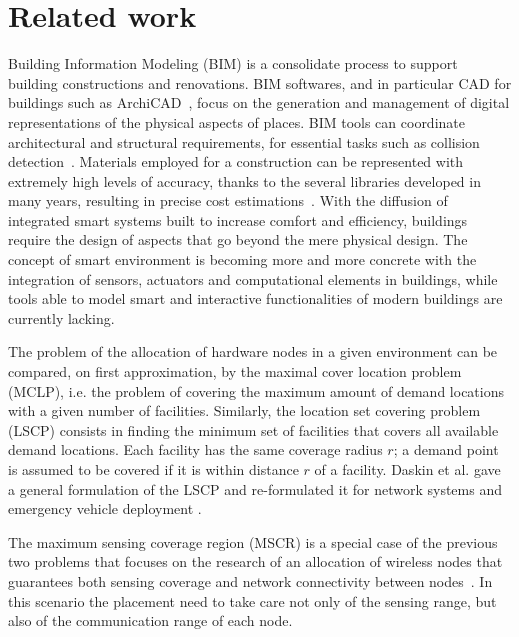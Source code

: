 \section{Related work}\label{sec:related}
Building Information Modeling (BIM) is a consolidate process to support building constructions and renovations. BIM softwares, and in particular CAD for buildings such as ArchiCAD~\cite{Archicad}, focus on the generation and management of digital representations of the physical aspects of places. BIM tools can coordinate architectural and structural requirements, for essential tasks such as collision detection~\cite{Zhang2011}. Materials employed for a construction can be represented with extremely high levels of accuracy, thanks to the several libraries developed in many years, resulting in precise cost estimations~\cite{Xu2014}. With the diffusion of integrated smart systems built to increase comfort and efficiency, buildings require the design of aspects that go beyond the mere physical design. The concept of smart environment is becoming more and more concrete with the integration of sensors, actuators and computational elements in buildings, while tools able to model smart and interactive functionalities of modern buildings are currently lacking.

The problem of the allocation of hardware nodes in a given environment can be compared, on first approximation, by the maximal cover location problem (MCLP), i.e. the problem of covering the maximum amount of demand locations with a given number of facilities. Similarly, the location set covering problem (LSCP) consists in finding the minimum set of facilities that covers all available demand locations. Each facility has the same coverage radius \(r\); a demand point is assumed to be covered if it is within distance \(r\) of a facility. Daskin et al. gave a general formulation of the LSCP \cite{Daskin1983} and re-formulated it for network systems and emergency vehicle deployment \cite{Daskin1981}.

The maximum sensing coverage region (MSCR) is a special case of the previous two problems that focuses on the research of an allocation of wireless nodes that guarantees both sensing coverage and network connectivity between nodes~\cite{VinhTranQuang, So2005}. In this scenario the placement need to take care not only of the sensing range, but also of the communication range of each node.

